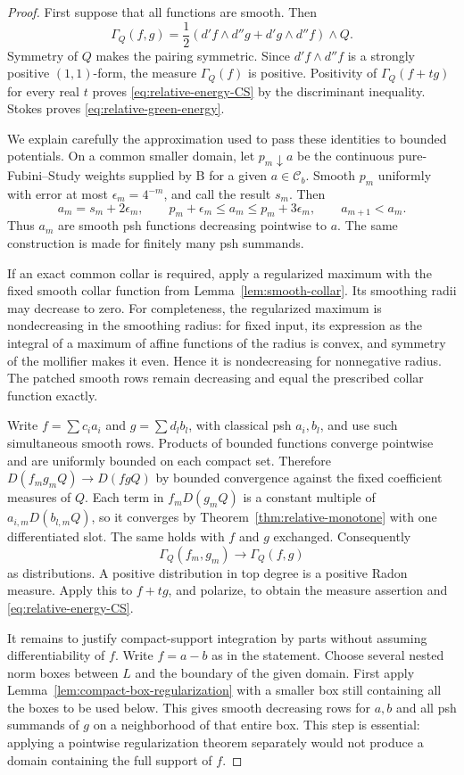 \documentclass[11pt,a4paper]{article}
\numberwithin{equation}{section}
\theoremstyle{definition}
\theoremstyle{remark}
\newcommand{\Cb}{\mathcal C_b}
\begin{document}
\begin{proof}
First suppose that all functions are smooth. Then
\[
 \Gamma_Q(f,g)
  =\frac12(d'f\wedge d''g+d'g\wedge d''f)\wedge Q.
\]
Symmetry of $Q$ makes the pairing symmetric. Since
$d'f\wedge d''f$ is a strongly positive $(1,1)$-form, the measure
$\Gamma_Q(f)$ is positive. Positivity of
$\Gamma_Q(f+t g)$ for every real $t$ proves
\eqref{eq:relative-energy-CS} by the discriminant inequality.
Stokes proves \eqref{eq:relative-green-energy}.

We explain carefully the approximation used to pass these identities
to bounded potentials. On a common smaller domain, let $p_m\downarrow a$
be the continuous pure-Fubini--Study weights supplied by \textup{B} for
a given $a\in\Cb$. Smooth $p_m$ uniformly with error at most
$\epsilon_m=4^{-m}$, and call the result $s_m$. Then
\[
 a_m=s_m+2\epsilon_m,
 \qquad
 p_m+\epsilon_m\leq a_m\leq p_m+3\epsilon_m,
 \qquad a_{m+1}<a_m.
\]
Thus $a_m$ are smooth psh functions decreasing pointwise to $a$.
The same construction is made for finitely many psh summands.

If an exact common collar is required, apply a regularized maximum
with the fixed smooth collar function from
Lemma~\ref{lem:smooth-collar}. Its smoothing radii may decrease to zero.
For completeness, the regularized maximum is nondecreasing in the
smoothing radius: for fixed input, its expression as the integral of
a maximum of affine functions of the radius is convex, and symmetry
of the mollifier makes it even. Hence it is nondecreasing for
nonnegative radius. The patched smooth rows remain decreasing and
equal the prescribed collar function exactly.

Write $f=\sum c_i a_i$ and $g=\sum d_l b_l$, with classical psh
$a_i,b_l$, and use such simultaneous smooth rows. Products of bounded
functions converge pointwise and are uniformly bounded on each compact
set. Therefore $D(f_mg_mQ)\to D(fgQ)$ by bounded convergence against
the fixed coefficient measures of $Q$. Each term in $f_mD(g_mQ)$
is a constant multiple of $a_{i,m}D(b_{l,m}Q)$, so it converges by
Theorem~\ref{thm:relative-monotone} with one differentiated slot.
The same holds with $f$ and $g$ exchanged. Consequently
\[
 \Gamma_Q(f_m,g_m)\longrightarrow\Gamma_Q(f,g)
\]
as distributions. A positive distribution in top degree is a positive
Radon measure. Apply this to $f+t g$, and polarize, to obtain the
measure assertion and \eqref{eq:relative-energy-CS}.

It remains to justify compact-support integration by parts without
assuming differentiability of $f$. Write $f=a-b$ as in the statement.
Choose several nested norm boxes between $L$ and the boundary of the
given domain. First apply Lemma~\ref{lem:compact-box-regularization}
with a smaller box still containing all the boxes to be used below.
This gives smooth decreasing rows for $a,b$ and all psh summands of
$g$ on a neighborhood of that entire box. This step is essential:
applying a pointwise regularization theorem separately would not
produce a domain containing the full support of $f$.


\end{proof}
\end{document}
